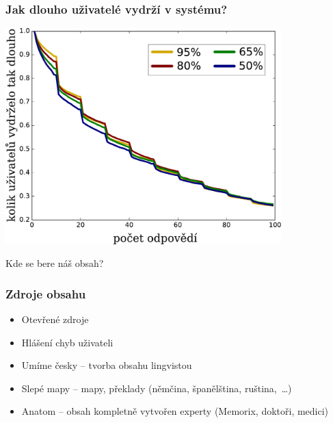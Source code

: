 \documentclass[xcolor=svgnames]{beamer}
\begin{document}
\begin{frame}
	\frametitle{Jak dlouho uživatelé vydrží v systému?}
	\begin{center}
		\includegraphics[width=0.8\textwidth]{img/drop-off}
	\end{center}
\end{frame}
\begin{frame}
	\begin{center}
		\Huge{Kde se bere náš obsah?}
	\end{center}
\end{frame}
\begin{frame}
	\frametitle{Zdroje obsahu}

	\begin{itemize}
	    \item Otevřené zdroje
	    \item Hlášení chyb uživateli
	    \item Umíme česky -- tvorba obsahu lingvistou
		\item Slepé mapy -- mapy, překlady (němčina, španělština, ruština,~\dots)
		\item Anatom -- obsah kompletně vytvořen experty (Memorix, doktoři, medici)
	\end{itemize}
\end{frame}
\end{document}
